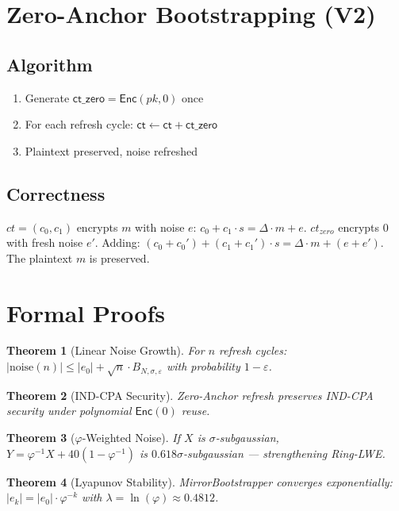 \documentclass[11pt,a4paper]{article}
\newtheorem{theorem}{Theorem}[section]
\begin{document}
\section{Zero-Anchor Bootstrapping (V2)}

\subsection{Algorithm}
\begin{enumerate}
    \item Generate $\mathsf{ct\_zero} = \mathsf{Enc}(pk, 0)$ once
    \item For each refresh cycle: $\mathsf{ct} \leftarrow \mathsf{ct} + \mathsf{ct\_zero}$
    \item Plaintext preserved, noise refreshed
\end{enumerate}

\subsection{Correctness}
$ct = (c_0, c_1)$ encrypts $m$ with noise $e$: $c_0 + c_1 \cdot s = \Delta \cdot m + e$. $ct_{zero}$ encrypts $0$ with fresh noise $e'$. Adding: $(c_0+c_0') + (c_1+c_1') \cdot s = \Delta \cdot m + (e + e')$. The plaintext $m$ is preserved.

\section{Formal Proofs}

\begin{theorem}[Linear Noise Growth]
For $n$ refresh cycles: $|\text{noise}(n)| \leq |e_0| + \sqrt{n} \cdot B_{N,\sigma,\varepsilon}$ with probability $1-\varepsilon$.
\end{theorem}

\begin{theorem}[IND-CPA Security]
Zero-Anchor refresh preserves IND-CPA security under polynomial $\mathsf{Enc}(0)$ reuse.
\end{theorem}

\begin{theorem}[$\varphi$-Weighted Noise]
If $X$ is $\sigma$-subgaussian, $Y = \varphi^{-1}X + 40(1-\varphi^{-1})$ is $0.618\sigma$-subgaussian — strengthening Ring-LWE.
\end{theorem}

\begin{theorem}[Lyapunov Stability]
MirrorBootstrapper converges exponentially: $|e_k| = |e_0| \cdot \varphi^{-k}$ with $\lambda = \ln(\varphi) \approx 0.4812$.
\end{theorem}
\end{document}
